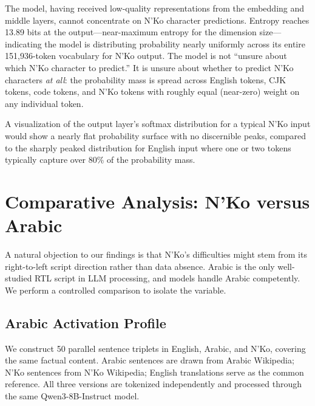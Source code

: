\documentclass[11pt]{article}
\begin{document}
The model, having received low-quality representations from the embedding and middle layers, cannot concentrate on N'Ko character predictions.
Entropy reaches 13.89 bits at the output---near-maximum entropy for the dimension size---indicating the model is distributing probability nearly uniformly across its entire 151,936-token vocabulary for N'Ko output.
The model is not ``unsure about which N'Ko character to predict.''
It is unsure about whether to predict N'Ko characters \emph{at all}: the probability mass is spread across English tokens, CJK tokens, code tokens, and N'Ko tokens with roughly equal (near-zero) weight on any individual token.

A visualization of the output layer's softmax distribution for a typical N'Ko input would show a nearly flat probability surface with no discernible peaks, compared to the sharply peaked distribution for English input where one or two tokens typically capture over 80\% of the probability mass.

\section{Comparative Analysis: N'Ko versus Arabic}
\label{sec:arabic-comparison}

A natural objection to our findings is that N'Ko's difficulties might stem from its right-to-left script direction rather than data absence.
Arabic is the only well-studied RTL script in LLM processing, and models handle Arabic competently.
We perform a controlled comparison to isolate the variable.

\subsection{Arabic Activation Profile}

We construct 50 parallel sentence triplets in English, Arabic, and N'Ko, covering the same factual content.
Arabic sentences are drawn from Arabic Wikipedia; N'Ko sentences from N'Ko Wikipedia; English translations serve as the common reference.
All three versions are tokenized independently and processed through the same Qwen3-8B-Instruct model.
\end{document}
